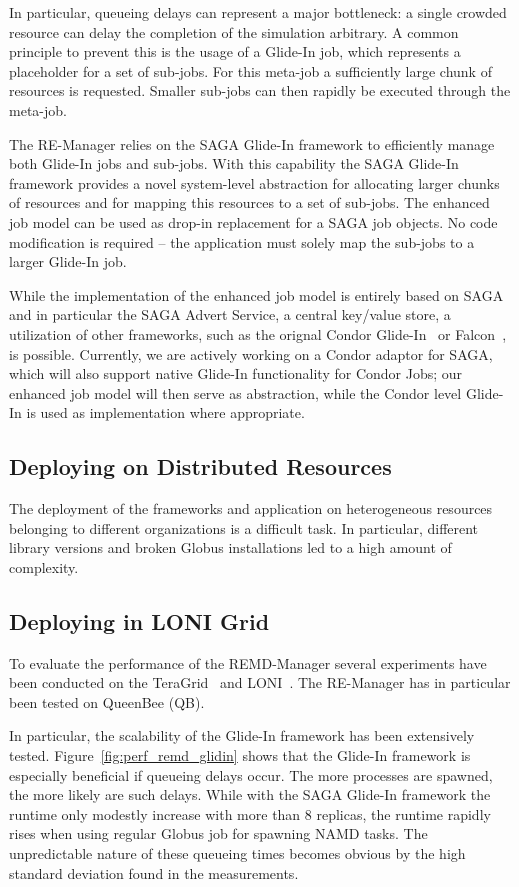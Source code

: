 \documentclass[conference,final]{IEEEtran}
\begin{document}
In particular, queueing delays can represent a major bottleneck: a single crowded 
resource can delay the completion of the simulation arbitrary. A common principle 
to prevent this is the usage of a Glide-In job, which represents a placeholder 
for a set of sub-jobs. For this meta-job a sufficiently large chunk of resources 
is requested. Smaller sub-jobs can then rapidly be executed through the meta-job.

The RE-Manager relies on the SAGA Glide-In framework to efficiently manage both 
Glide-In jobs and sub-jobs. With this capability the SAGA Glide-In framework
provides a novel system-level abstraction for allocating larger chunks of resources 
and for mapping this resources to a set of sub-jobs. The enhanced job model can 
be used as drop-in replacement for a SAGA job objects. No code modification is required
-- the application must solely map the sub-jobs to a larger Glide-In job.

While the implementation of the enhanced job model is entirely based on SAGA 
and in particular the SAGA Advert Service, a central key/value store, a utilization
of other frameworks, such as the orignal Condor Glide-In~\cite{citeulike:291860} or 
Falcon~\cite{1362680}, is possible. Currently, we are actively working on a Condor 
adaptor for SAGA, which will also support native Glide-In functionality for Condor Jobs; 
our enhanced job model 
will then serve as abstraction, while the Condor level Glide-In is used as implementation 
where appropriate. 

\subsection{Deploying on Distributed Resources}

The deployment of the frameworks and application on heterogeneous resources belonging to 
different organizations is a difficult task. In particular, different library 
versions and broken Globus installations led to a high amount of complexity.

\subsection{Deploying in LONI Grid}

To evaluate the performance of the REMD-Manager several
experiments have been conducted on the TeraGrid~\cite{teragrid} and LONI~\cite{loni}. 
The RE-Manager has in particular been tested on QueenBee (QB). 

In particular, the scalability of the Glide-In framework has been extensively tested.
Figure~\ref{fig:perf_remd_glidin} shows that the Glide-In framework is especially 
beneficial if queueing delays occur. The more processes are spawned, the more likely are
such delays. While with the SAGA Glide-In framework the runtime only modestly increase 
with more than 8 replicas, the runtime rapidly rises when using regular Globus job
for spawning NAMD tasks. The unpredictable nature of these queueing times becomes obvious
by the high standard deviation found in the measurements.
\end{document}

